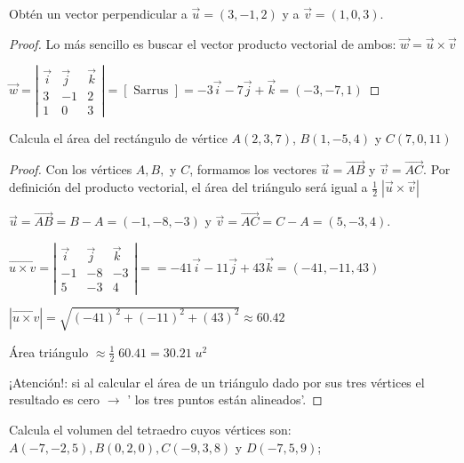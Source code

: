 \begin{ejre}
	Obtén un vector perpendicular a $\vec u=(3,-1,2)$ y  a $\vec v=(1,0,3)$.
\end{ejre}

\begin{proof}\renewcommand{\qedsymbol}{$\diamond$}
	
	Lo más sencillo es buscar el vector producto vectorial de ambos: $ \vec w =\vec u \times \vec v$
	
	$\overrightarrow { w } =\left| \begin{matrix} \vec { i }  & \vec { j }  & \vec { k }  \\ 3 & -1 & 2 \\ 1 & 0 & 3 \end{matrix} \right| =[\text{ Sarrus }] =-3\vec { i } -7\vec { j } +\vec { k } =(-3,-7,1)$
\end{proof}


\begin{ejre}
	Calcula el área del rectángulo de vértice  $A(2,3,7)$, $B(1,-5,4)$  y  $C(7,0,11)$
\end{ejre}

\begin{proof}\renewcommand{\qedsymbol}{$\diamond$}
	
	Con los vértices $A, B,$ y $C$, formamos los vectores $\vec u=\overrightarrow {AB}$ y $\vec v=\overrightarrow {AC}$. Por definición del producto vectorial, el área del triángulo será igual a $ \frac 1 2 \; | \vec u \times \vec v |$

$\vec u=\overrightarrow {AB}=B-A=(-1,-8,-3)$ y $\vec v=\overrightarrow {AC}= C-A=(5, -3, 4)$.

$\overrightarrow { u \times v } =\left| \begin{matrix} \vec { i }  & \vec { j }  & \vec { k }  \\ -1 & -8 & -3 \\ 5 & -3 & 4 \end{matrix} \right| ==-41\vec { i } -11\vec { j } +43\vec { k } =(-41,-11,43)$

$|\overrightarrow { u \times v } | = \sqrt{(-41)^2+(-11)^2+(43)^2}\approx 60.42$

Área triángulo $ \approx  \frac 1 2 \; 60.41 = 30.21\; u^2$

¡Atención!: si al calcular el área de un triángulo dado por sus tres vértices el resultado es cero $\to$ ' los tres puntos están alineados'.
\end{proof}

\begin{ejre}
	Calcula el volumen del tetraedro cuyos vértices son: $A(-7,-2,5), B(0,2,0), C(-9,3,8)$  y $D(-7,5,9)$; 
\end{ejre}

